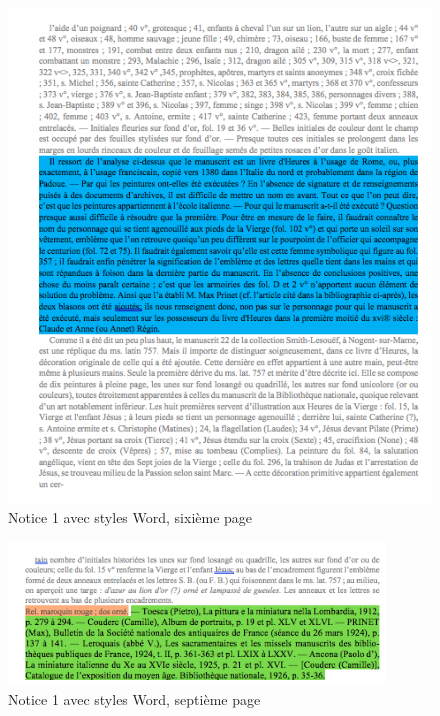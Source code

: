 \documentclass[a4paper,12pt,twoside]{book}
\begin{document}
    \begin{figure}[!h]
    \centering
    \includegraphics[width=15cm]{img/Doc_Sources_transformation/Docs_Word_Styles/Notice1/StylesNotice1_6.png}
    \caption{Notice 1 avec styles Word, sixième page}
    \end{figure}
    \clearpage
    
    \begin{figure}[!h]
    \centering
    \includegraphics[width=10cm]{img/Doc_Sources_transformation/Docs_Word_Styles/Notice1/StylesNotice1_7.png}
    \caption{Notice 1 avec styles Word, septième page}
    \end{figure}
    
    
\end{document}
